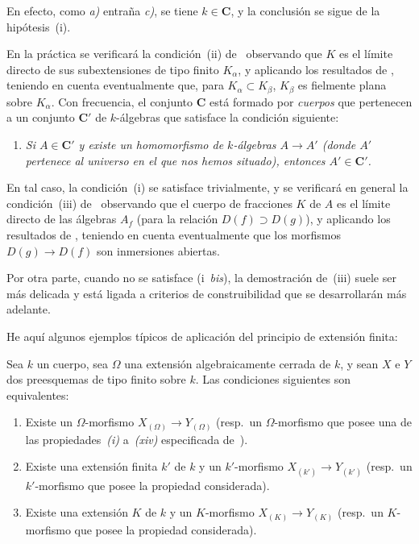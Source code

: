 En efecto, como \emph{a)} entraña \emph{c)}, se tiene $k\in\boldsymbol{C}$, y la conclusión se sigue de la hipótesis~(i).

\begin{remark}[9.1.3]
\label{IV.9.1.3}
En la práctica se verificará la condición~(ii) de~ observando que $K$ es el límite directo de sus subextensiones de tipo finito $K_\alpha$, y aplicando los resultados de , teniendo en cuenta eventualmente que, para $K_\alpha\subset K_\beta$, $K_\beta$ es fielmente plana sobre $K_\alpha$.
Con frecuencia, el conjunto $\boldsymbol{C}$ está formado por \emph{cuerpos} que pertenecen a un conjunto $\boldsymbol{C}'$ de $k$-álgebras que satisface la condición siguiente:
\begin{enumerate}[label=(\roman*~\emph{bis})]
  \item \itshape Si $A\in\boldsymbol{C}'$ y existe un homomorfismo de $k$-álgebras $A\to A'$ (donde $A'$ pertenece al universo en el que nos hemos situado), entonces $A'\in\boldsymbol{C}'$.
\end{enumerate}
\end{remark}

En tal caso, la condición~(i) se satisface trivialmente, y se verificará en general la condición~(iii) de~ observando que el cuerpo de fracciones $K$ de $A$ es el límite directo de las álgebras $A_f$ (para la relación $D(f)\supset D(g)$), y aplicando los resultados de , teniendo en cuenta eventualmente que los morfismos $D(g)\to D(f)$ son inmersiones abiertas.

Por otra parte, cuando no se satisface (i~\emph{bis}), la demostración de~(iii) suele ser más delicada y está ligada a criterios de construibilidad que se desarrollarán más adelante.

He aquí algunos ejemplos típicos de aplicación del principio de extensión finita:

\begin{proposition}[9.1.4]
\label{IV.9.1.4}
Sea $k$ un cuerpo, sea $\Omega$ una extensión algebraicamente cerrada de $k$, y sean $X$ e $Y$ dos preesquemas de tipo finito sobre $k$.
Las condiciones siguientes son equivalentes:
\begin{enumerate}[label=\emph{\alph*)}]
  \item Existe un $\Omega$-morfismo $X_{(\Omega)}\to Y_{(\Omega)}$ \textnormal{(}\textup{resp.}\ un $\Omega$-morfismo que posee una de las propiedades~\emph{(i)} a~\emph{(xiv)} especificada de~\textnormal{)}.
  \item Existe una extensión finita $k'$ de $k$ y un $k'$-morfismo $X_{(k')}\to Y_{(k')}$ \textnormal{(}\textup{resp.}\ un $k'$-morfismo que posee la propiedad considerada\textnormal{)}.
  \item Existe una extensión $K$ de $k$ y un $K$-morfismo $X_{(K)}\to Y_{(K)}$ \textnormal{(}\textup{resp.}\ un $K$-morfismo que posee la propiedad considerada\textnormal{)}.
\end{enumerate}
\end{proposition}

